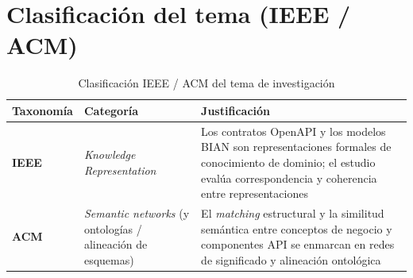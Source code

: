 \section{Clasificación del tema (IEEE / ACM)}

\begin{table}[H]
  \centering
  \caption{Clasificación IEEE / ACM del tema de investigación}
  \label{tab:clasificacion}
  \begin{tabular}{@{}p{}p{}p{}@{}}
    \toprule
    \textbf{Taxonomía} & \textbf{Categoría} & \textbf{Justificación} \\
    \midrule
    \textbf{IEEE} & \textit{Knowledge Representation} &
    Los contratos OpenAPI y los modelos BIAN son representaciones formales de conocimiento de
    dominio; el estudio evalúa correspondencia y coherencia entre representaciones \\
    \textbf{ACM} & \textit{Semantic networks} (y ontologías / alineación de esquemas) &
    El \textit{matching} estructural y la similitud semántica entre conceptos de negocio y
    componentes API se enmarcan en redes de significado y alineación ontológica \\
    \bottomrule
  \end{tabular}
\end{table}

